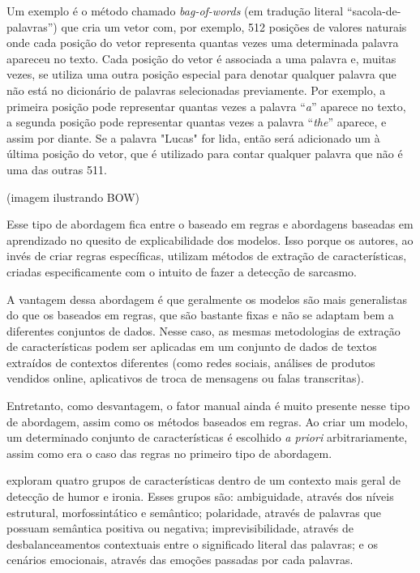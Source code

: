 Um exemplo é o método chamado \textit{bag-of-words} (em tradução literal
``sacola-de-palavras'') que cria um vetor com, por exemplo, 512 posições de
valores naturais onde cada posição do vetor representa quantas vezes uma
determinada palavra  apareceu no texto. Cada posição do vetor é associada a uma
palavra e, muitas vezes, se utiliza uma outra posição especial para denotar
qualquer palavra que não está no dicionário de palavras selecionadas
previamente. Por exemplo, a primeira posição pode representar quantas vezes a
palavra ``\textit{a}'' aparece no texto, a segunda posição pode representar
quantas vezes a palavra ``\textit{the}'' aparece, e assim por diante. Se a
palavra "Lucas" for lida, então será adicionado um à última posição do vetor,
que é utilizado para contar qualquer palavra que não é uma das outras 511.

(imagem ilustrando BOW)

Esse tipo de abordagem fica entre o baseado em regras e abordagens baseadas em
aprendizado no quesito de explicabilidade dos modelos. Isso porque os
autores, ao invés de criar regras específicas, utilizam métodos de extração de
características, criadas especificamente com o intuito de fazer a detecção de
sarcasmo.

A vantagem dessa abordagem é que geralmente os modelos são mais generalistas do
que os baseados em regras, que são bastante fixas e não se adaptam bem a
diferentes conjuntos de dados. Nesse caso, as mesmas metodologias de extração de
características podem ser aplicadas em um conjunto de dados de textos extraídos
de contextos diferentes (como redes sociais, análises de produtos vendidos
online, aplicativos de troca de mensagens ou falas transcritas).

Entretanto, como desvantagem, o fator manual ainda é muito presente nesse tipo
de abordagem, assim como os métodos baseados em regras. Ao criar um modelo, um
determinado conjunto de características é escolhido \textit{a priori}
arbitrariamente, assim como era o caso das regras no primeiro tipo de abordagem.

\cite{reyes:2012:from-humor} exploram quatro grupos de características dentro de
um contexto mais geral de detecção de humor e ironia. Esses grupos são:
ambiguidade, através dos níveis estrutural, morfossintático e semântico;
polaridade, através de palavras que possuam semântica positiva ou negativa;
imprevisibilidade, através de desbalanceamentos contextuais entre o significado
literal das palavras; e os cenários emocionais, através das emoções passadas por
cada palavras.

